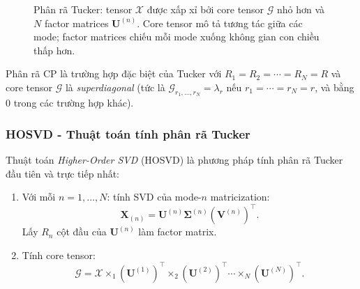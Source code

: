 \begin{figure}[h]
{
}
\caption{Phân rã Tucker: tensor $\mathcal{X}$ được xấp xỉ bởi core tensor $\mathcal{G}$ nhỏ hơn và $N$ factor matrices $\mathbf{U}^{(n)}$. Core tensor mô tả tương tác giữa các mode; factor matrices chiếu mỗi mode xuống không gian con chiều thấp hơn.}
\label{fig:tucker-decomp}
\end{figure}

\begin{proposition}
Phân rã CP là trường hợp đặc biệt của Tucker với $R_1 = R_2 = \cdots = R_N = R$ và core tensor $\mathcal{G}$ là \textit{superdiagonal} (tức là $\mathcal{G}_{r_1,\ldots,r_N} = \lambda_r$ nếu $r_1 = \cdots = r_N = r$, và bằng 0 trong các trường hợp khác).
\end{proposition}

\subsubsection{HOSVD - Thuật toán tính phân rã Tucker}

Thuật toán \textit{Higher-Order SVD} (HOSVD) \cite{delathauwer2000multilinear} là phương pháp tính phân rã Tucker đầu tiên và trực tiếp nhất:

\begin{enumerate}
    \item Với mỗi $n = 1, \ldots, N$: tính SVD của mode-$n$ matricization:
    \begin{equation}
        \mathbf{X}_{(n)} = \mathbf{U}^{(n)} \boldsymbol{\Sigma}^{(n)} (\mathbf{V}^{(n)})^\top.
    \end{equation}
    Lấy $R_n$ cột đầu của $\mathbf{U}^{(n)}$ làm factor matrix.
    \item Tính core tensor:
    \begin{equation}
        \mathcal{G} = \mathcal{X} \times_1 (\mathbf{U}^{(1)})^\top \times_2 (\mathbf{U}^{(2)})^\top \cdots \times_N (\mathbf{U}^{(N)})^\top.
    \end{equation}
\end{enumerate}

